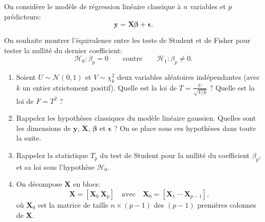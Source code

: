 \documentclass{../headers/td_upc}
\providecommand{\1}{\mathds{1}}
\begin{document}
On considère le modèle de régression linéaire classique à $n$ variables et $p$ prédicteurs:
$$
\mathbf{y} = \mathbf{X} \boldsymbol{\beta} + \boldsymbol{\epsilon}.
$$

On souhaite montrer l'équivalence entre les tests de Student et de Fisher pour
tester la nullité du dernier coefficient:
$$
\mathcal{H}_{0}: \beta_{p}=0 \qquad \text{contre} \qquad \mathcal{H}_{1}: \beta_{p} \neq 0.
$$

\begin{enumerate}
  \item Soient $U \sim \mathcal{N}(0, 1)$ et $V \sim \chi^2_k$
  deux variables aléatoires indépendantes (avec $k$ un entier strictement positif).
  Quelle est la loi de $T = \frac{U}{\sqrt{V/k}}$ ?
  Quelle est la loi de $F = T^{2}$ ?
  
  
  \item Rappelez les hypothèses classiques du modèle linéaire gaussien.
  Quelles sont les dimensions de $\mathbf{y}$, $\mathbf{X}$, $\boldsymbol{\beta}$ et $\boldsymbol{\epsilon}$ ?
  On se place sous ces hypothèses dans toute la suite.
  
  
  \item Rappelez la statistique $T_p$ du test de Student pour la nullité du coefficient $\beta_p$,
  et sa loi sous l'hypothèse $\mathcal{H}_{0}$.
  
  
  \item On décompose $\mathbf{X}$ en blocs:
  $$
  \mathbf{X} = \left[\mathbf{X}_{0} \  \mathbf{X}_{p}\right]
  \quad \text{avec} \quad
  \mathbf{X}_{0} = \left[\mathbf{X}_{1}\ \cdots\ \mathbf{X}_{p-1}\right],
  $$
  où $\mathbf{X}_{0}$ est la matrice de taille $n \times(p-1)$
  des $(p-1)$ premières colonnes de $\mathbf{X}$.
  

\end{enumerate}
\end{document}
